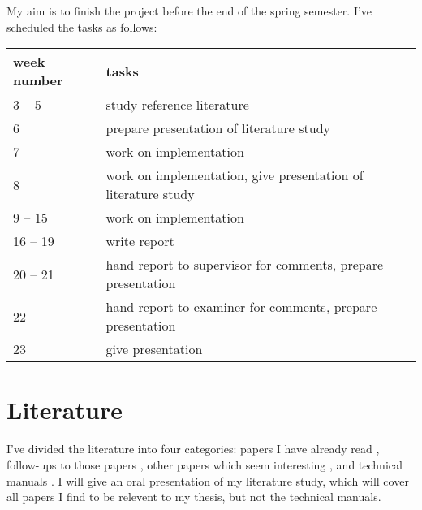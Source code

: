 \documentclass[a4paper,11pt]{kth-mag}
\begin{document}
My aim is to finish the project before the end of the spring semester.
I've scheduled the tasks as follows:

\begin{table}[h]
\centering
\begin{tabular}{l|l}
week number & tasks \\
\hline
3 -- 5      & study reference literature \\
6           & prepare presentation of literature study \\
7           & work on implementation \\
8           & work on implementation, give presentation of literature study \\
9 -- 15     & work on implementation \\
16 -- 19    & write report \\
20 -- 21    & hand report to supervisor for comments, prepare presentation \\
22          & hand report to examiner for comments, prepare presentation \\
23          & give presentation \\
\end{tabular}
\end{table}

\section*{Literature}

I've divided the literature into four categories:
papers I have already read \cite{massalin87,granlund92,joshi02,bansal06},
follow-ups to those papers \cite{joshi03,joshi06,bansal_thesis},
other papers which seem interesting \cite{bansal08,brain06_iclp,brain06_nmr,crick09,crick_thesis,fraser88,gulwani10,knights09,tate09,tate10},
and technical manuals \cite{intel11_2a,intel11_2b}.
I will give an oral presentation of my literature study, which will cover all papers I find to be relevent to my thesis, but not the technical manuals.


\end{document}
